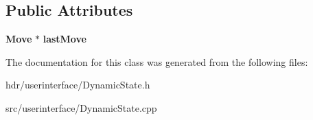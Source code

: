 \subsection*{Public Attributes}
\begin{DoxyCompactItemize}
\item 
{\bf Move} $\ast$ {\bfseries last\-Move}\label{class_dynamic_state_ada602a437f88f5761899b730c7ebad23}

\end{DoxyCompactItemize}


The documentation for this class was generated from the following files\-:\begin{DoxyCompactItemize}
\item 
hdr/userinterface/Dynamic\-State.\-h\item 
src/userinterface/Dynamic\-State.\-cpp\end{DoxyCompactItemize}
